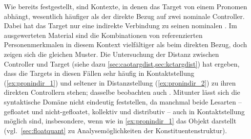 Wie bereits festgestellt, sind Kontexte, in denen das Target  von
einem Pronomen abhängt, wesentlich häufiger als der direkte Bezug auf zwei
nominale Controller. Dabei hat das Target nur eine indirekte Verbindung zu
seinen nominalen . Im ausgewerteten Material sind die
Kombinationen von referenzierten Personenmerkmalen in diesem Kontext
vielfältiger als beim direkten Bezug, doch zeigen sich die gleichen Muster. Die
Untersuchung der Distanz zwischen Controller und Target (siehe dazu
\cref{sec:caotargdist,sec:kctargdist}) hat ergeben, dass die Targets in diesen
Fällen sehr häufig in Kontaktstellung (\ref{ex:pronindir_1}) und seltener in
Distanzstellung (\ref{ex:pronindir_2}) zu ihren direkten Controllern stehen;
dasselbe beobachten auch \citet[624]{ksw2}. Mitunter lässt sich die
syntaktische Domäne nicht eindeutig feststellen, da manchmal beide Lesarten --
gefloatet und nicht-gefloatet, kollektiv und distributiv -- auch in
Kontaktstellung möglich sind, insbesondere, wenn  wie in
\cref{ex:pronindir_1} das Objekt darstellt (vgl.~\cref{sec:floatquant} zu
Analysemöglichkeiten der Konstituentenstruktur).

